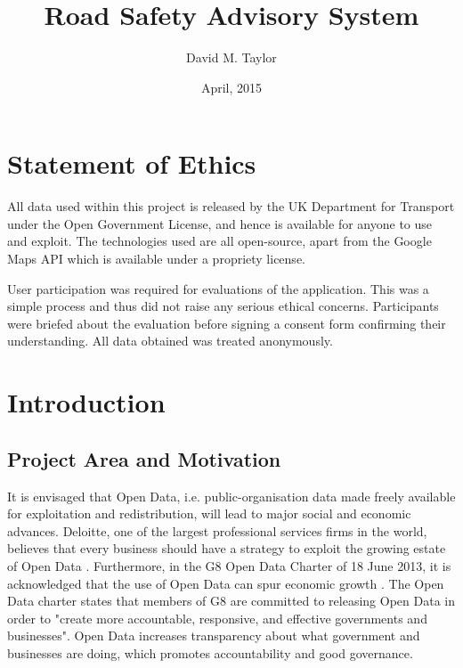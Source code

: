 \documentclass[authoryearcitations]{UoYCSproject}
\author{David M. Taylor}
\title{Road Safety Advisory System}
\date{April, 2015}
\begin{document}
\maketitle
\listoffigures
\listoftables
\renewcommand*{\lstlistlistingname}{List of Listings}

\cleardoublepage
\label{sec:start}
\thispagestyle{empty}\cleardoublepage

\chapter*{Statement of Ethics}
All data used within this project is released by the UK Department for Transport under the Open Government License, and hence is available for anyone to use and exploit. The technologies used are all open-source, apart from the Google Maps API which is available under a propriety license.

User participation was required for evaluations of the application. This was a simple process and thus did not raise any serious ethical concerns. Participants were briefed about the evaluation before signing a consent form confirming their understanding. All data obtained was treated anonymously.

\chapter{Introduction}

\section{Project Area and Motivation}

It is envisaged that Open Data, i.e. public-organisation data made freely available for exploitation and redistribution, will lead to major social and economic advances. Deloitte, one of the largest professional services firms in the world, believes that every business should have a strategy to exploit the growing estate of Open Data \citep{DeloitteAnalytics2012}. Furthermore, in the G8 Open Data Charter of 18 June 2013, it is acknowledged that the use of Open Data can spur economic growth \citep{CabinetOffice2013}. The Open Data charter states that members of G8 are committed to releasing Open Data in order to "create more accountable, responsive, and effective governments and businesses". Open Data increases transparency about what government and businesses are doing, which promotes accountability and good governance.
\end{document}
